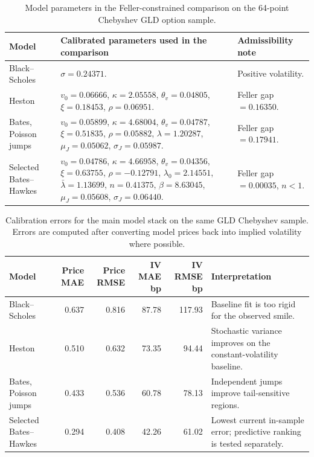\documentclass[a4paper,10pt,titlepage,oneside,openany]{book}
\theoremstyle{plain}
\theoremstyle{definition}
\theoremstyle{remark}
\begin{document}
\begin{table}[H]
\centering
\scriptsize
\setlength{\tabcolsep}{2.8pt}
\begin{tabularx}{\textwidth}{@{}>{\RaggedRight\arraybackslash}p{2.4cm}>{\RaggedRight\arraybackslash}X>{\RaggedRight\arraybackslash}p{2.8cm}@{}}
\toprule
\textbf{Model} & \textbf{Calibrated parameters used in the comparison} & \textbf{Admissibility note} \\
\midrule
Black--Scholes & \(\sigma=0.24371\). & Positive volatility. \\
Heston & \(v_0=0.06666\), \(\kappa=2.05558\), \(\theta_v=0.04805\), \(\xi=0.18453\), \(\rho=0.06951\). & Feller gap \(=0.16350\). \\
Bates, Poisson jumps & \(v_0=0.05899\), \(\kappa=4.68004\), \(\theta_v=0.04787\), \(\xi=0.51835\), \(\rho=0.05882\), \(\lambda=1.20287\), \(\mu_J=0.05062\), \(\sigma_J=0.05987\). & Feller gap \(=0.17941\). \\
Selected Bates--Hawkes & \(v_0=0.04786\), \(\kappa=4.66958\), \(\theta_v=0.04356\), \(\xi=0.63755\), \(\rho=-0.12791\), \(\lambda_0=2.14551\), \(\bar{\lambda}=1.13699\), \(n=0.41375\), \(\beta=8.63045\), \(\mu_J=0.05608\), \(\sigma_J=0.06440\). & Feller gap \(=0.00035\), \(n<1\). \\
\bottomrule
\end{tabularx}
\caption{Model parameters in the Feller-constrained comparison on the 64-point Chebyshev GLD option sample.}
\label{tab:model-parameters}
\end{table}

\begin{table}[H]
\centering
\scriptsize
\setlength{\tabcolsep}{3.2pt}
\begin{tabularx}{\textwidth}{@{}>{\RaggedRight\arraybackslash}p{2.4cm}rrrr>{\RaggedRight\arraybackslash}X@{}}
\toprule
\textbf{Model} & \textbf{Price MAE} & \textbf{Price RMSE} & \textbf{IV MAE bp} & \textbf{IV RMSE bp} & \textbf{Interpretation} \\
\midrule
Black--Scholes & 0.637 & 0.816 & 87.78 & 117.93 & Baseline fit is too rigid for the observed smile. \\
Heston & 0.510 & 0.632 & 73.35 & 94.44 & Stochastic variance improves on the constant-volatility baseline. \\
Bates, Poisson jumps & 0.433 & 0.536 & 60.78 & 78.13 & Independent jumps improve tail-sensitive regions. \\
Selected Bates--Hawkes & 0.294 & 0.408 & 42.26 & 61.02 & Lowest current in-sample error; predictive ranking is tested separately. \\
\bottomrule
\end{tabularx}
\caption{Calibration errors for the main model stack on the same GLD Chebyshev sample. Errors are computed after converting model prices back into implied volatility where possible.}
\label{tab:model-errors}
\end{table}
\end{document}
